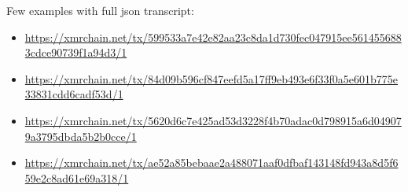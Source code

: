 \documentclass[]{article}
\begin{document}


Few examples with full json transcript:
\begin{itemize}
	\item \footnotesize\url{https://xmrchain.net/tx/599533a7e42e82aa23c8da1d730fec047915ee5614556883cdce90739f1a94d3/1}
	
	\item \footnotesize\url{https://xmrchain.net/tx/84d09b596cf847eefd5a17ff9eb493e6f33f0a5e601b775e33831cdd6cadf53d/1}
	
	\item \footnotesize\url{https://xmrchain.net/tx/5620d6c7e425ad53d3228f4b70adac0d798915a6d049079a3795dbda5b2b0cce/1}
	
	\item \footnotesize\url{https://xmrchain.net/tx/ae52a85bebaae2a488071aaf0dfbaf143148fd943a8d5f659e2c8ad61e69a318/1}
\end{itemize}

{}

	
\end{document}
